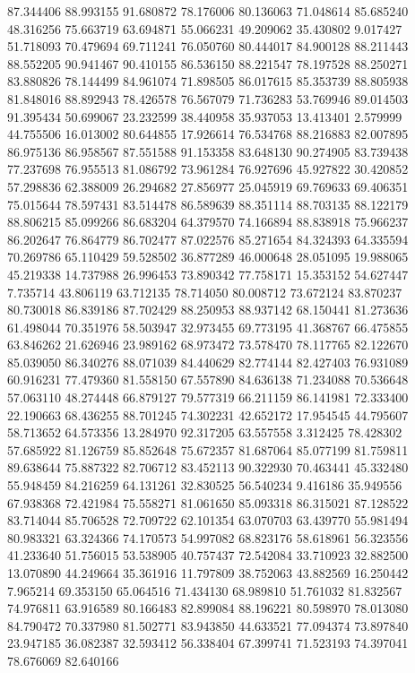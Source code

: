 87.344406
88.993155
91.680872
78.176006
80.136063
71.048614
85.685240
48.316256
75.663719
63.694871
55.066231
49.209062
35.430802
9.017427
51.718093
70.479694
69.711241
76.050760
80.444017
84.900128
88.211443
88.552205
90.941467
90.410155
86.536150
88.221547
78.197528
88.250271
83.880826
78.144499
84.961074
71.898505
86.017615
85.353739
88.805938
81.848016
88.892943
78.426578
76.567079
71.736283
53.769946
89.014503
91.395434
50.699067
23.232599
38.440958
35.937053
13.413401
2.579999
44.755506
16.013002
80.644855
17.926614
76.534768
88.216883
82.007895
86.975136
86.958567
87.551588
91.153358
83.648130
90.274905
83.739438
77.237698
76.955513
81.086792
73.961284
76.927696
45.927822
30.420852
57.298836
62.388009
26.294682
27.856977
25.045919
69.769633
69.406351
75.015644
78.597431
83.514478
86.589639
88.351114
88.703135
88.122179
88.806215
85.099266
86.683204
64.379570
74.166894
88.838918
75.966237
86.202647
76.864779
86.702477
87.022576
85.271654
84.324393
64.335594
70.269786
65.110429
59.528502
36.877289
46.000648
28.051095
19.988065
45.219338
14.737988
26.996453
73.890342
77.758171
15.353152
54.627447
7.735714
43.806119
63.712135
78.714050
80.008712
73.672124
83.870237
80.730018
86.839186
87.702429
88.250953
88.937142
68.150441
81.273636
61.498044
70.351976
58.503947
32.973455
69.773195
41.368767
66.475855
63.846262
21.626946
23.989162
68.973472
73.578470
78.117765
82.122670
85.039050
86.340276
88.071039
84.440629
82.774144
82.427403
76.931089
60.916231
77.479360
81.558150
67.557890
84.636138
71.234088
70.536648
57.063110
48.274448
66.879127
79.577319
66.211159
86.141981
72.333400
22.190663
68.436255
88.701245
74.302231
42.652172
17.954545
44.795607
58.713652
64.573356
13.284970
92.317205
63.557558
3.312425
78.428302
57.685922
81.126759
85.852648
75.672357
81.687064
85.077199
81.759811
89.638644
75.887322
82.706712
83.452113
90.322930
70.463441
45.332480
55.948459
84.216259
64.131261
32.830525
56.540234
9.416186
35.949556
67.938368
72.421984
75.558271
81.061650
85.093318
86.315021
87.128522
83.714044
85.706528
72.709722
62.101354
63.070703
63.439770
55.981494
80.983321
63.324366
74.170573
54.997082
68.823176
58.618961
56.323556
41.233640
51.756015
53.538905
40.757437
72.542084
33.710923
32.882500
13.070890
44.249664
35.361916
11.797809
38.752063
43.882569
16.250442
7.965214
69.353150
65.064516
71.434130
68.989810
51.761032
81.832567
74.976811
63.916589
80.166483
82.899084
88.196221
80.598970
78.013080
84.790472
70.337980
81.502771
83.943850
44.633521
77.094374
73.897840
23.947185
36.082387
32.593412
56.338404
67.399741
71.523193
74.397041
78.676069
82.640166
